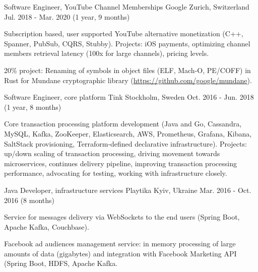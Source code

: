 

\begin{cventries}

  \cventry
    {Software Engineer, YouTube Channel Memberships} %
    {Google} %
    {Zurich, Switzerland} %
    {Jul. 2018 - Mar. 2020 (1 year, 9 months)} %
    {
      \begin{cvitems}
        \item {Subscription based, user supported YouTube alternative monetization (C++, Spanner, PubSub, CQRS, Stubby). Projects: iOS payments, optimizing channel members retrieval latency (100x for large channels), pricing levels.}
        \item {20\% project: Renaming of symbols in object files (ELF, Mach-O, PE/COFF) in Rust for Mundane cryptographic library (\url{https://github.com/google/mundane}).}
      \end{cvitems}
    }

  \cventry
    {Software Engineer, core platform} %
    {Tink} %
    {Stockholm, Sweden} %
    {Oct. 2016 - Jun. 2018 (1 year, 8 months)} %
    {
      \begin{cvitems} %
        \item {Core transaction processing platform development (Java and Go, Cassandra, MySQL, Kafka, ZooKeeper, Elasticsearch, AWS, Prometheus, Grafana, Kibana, SaltStack provisioning, Terraform-defined declarative infrastructure). Projects: up/down scaling of transaction processing, driving movement towards microservices, continues delivery pipeline, improving transaction processing performance, advocating for testing, working with infrastructure closely.}
      \end{cvitems}
    }

  \cventry
    {Java Developer, infrastructure services} %
    {Playtika} %
    {Kyiv, Ukraine} %
    {Mar. 2016 - Oct. 2016 (8 months)} %
    {
      \begin{cvitems} %
        \item {Service for messages delivery via WebSockets to the end users (Spring Boot, Apache Kafka, Couchbase).}
        \item {Facebook ad audiences management service: in memory processing of large amounts of data (gigabytes) and integration with Facebook Marketing API (Spring Boot, HDFS, Apache Kafka.}
      \end{cvitems}
    }


\end{cventries}
